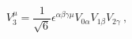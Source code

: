 \begin{equation} \label{l81-5}
V_{3}^{\mu}=\frac{1}{\sqrt{6}}\epsilon ^{\alpha \beta \gamma \mu}V_{0\alpha}V_{1\beta}V_{2\gamma}~,
\end{equation}

